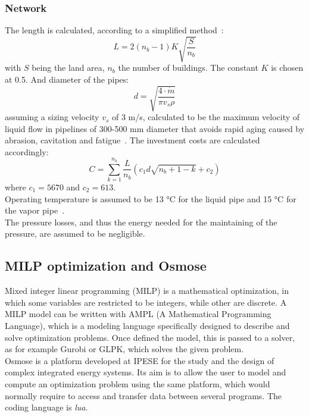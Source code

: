 \documentclass{article}
\begin{document}
\subsubsection{Network}\label{sss:net}
The length is calculated, according to a simplified method~\cite{girardinEnerGisGeographicalInformation2010}:
\begin{equation}
L = 2(n_{b}-1)K\sqrt{\frac{S}{n_{b}}}
\end{equation}
with $S$ being the land area, $n_{b}$ the number of buildings. The constant $K$ is chosen at 0.5.
And diameter of the pipes:
\begin{equation}
d = \sqrt{\frac{4\cdot \dot{m}}{\pi v_{s} \rho}}
\end{equation}
assuming a sizing velocity $v_{s}$ of 3 m/s, calculated to be the maximum velocity of liquid flow in pipelines of 300-500 mm diameter that avoids rapid aging caused by abrasion, cavitation and fatigue~\cite{henchozPerformanceProfitabilityPerspectives2015}.
The investment costs are calculated accordingly:
\begin{equation}
C = \sum_{k=1}^{n_{b}} \frac{L}{n_{b}} (c_{1} d \sqrt{n_{b}+1-k} + c_{2})
\end{equation}
where $c_{1} =5670 $ and $c_{2} = 613 $.\\

Operating temperature is assumed to be 13 \si{\celsius} for the liquid pipe and 15 \si{\celsius} for the vapor pipe~\cite{suciuEnergyautonomousCitiesUsing2016}.\\

The pressure losses, and thus the energy needed for the maintaining of the pressure, are assumed to be negligible.

\subsection{MILP optimization and Osmose}\label{ss:osmose}

Mixed integer linear programming (MILP) is a mathematical optimization, in which some variables are restricted to be integers, while other are discrete. A MILP model can be written with AMPL (A Mathematical Programming Language), which is a modeling language specifically designed to describe and solve optimization problems. Once defined the model, this is passed to a solver, as for example Gurobi or GLPK, which solves the given problem.\\

Osmose is a platform developed at IPESE for the study and the design of complex integrated energy systems. Its aim is to allow the user to model and compute an optimization problem using the same platform, which would normally require to access and transfer data between several programs. The coding language is \textit{lua}.
\end{document}
